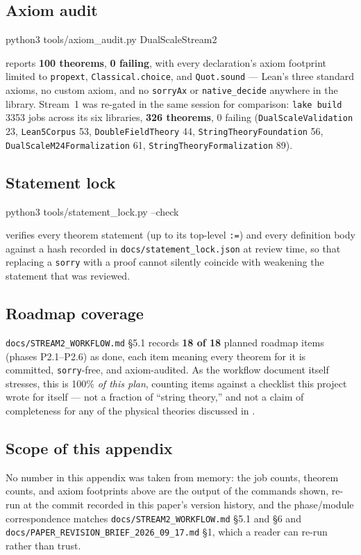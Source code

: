 \documentclass[11pt,a4paper]{article}
\theoremstyle{remark}
\begin{document}
\subsection{Axiom audit}
\begin{center}
\footnotesize\ttfamily
python3 tools/axiom\_audit.py DualScaleStream2
\end{center}
reports \textbf{100 theorems}, \textbf{0 failing}, with every declaration's axiom footprint limited
to \texttt{propext}, \texttt{Classical.choice}, and \texttt{Quot.sound} --- Lean's three standard
axioms, no custom axiom, and no \texttt{sorryAx} or \texttt{native\_decide} anywhere in the
library. Stream~1 was re-gated in the same session for comparison: \texttt{lake build} 3353 jobs
across its six libraries, \textbf{326 theorems}, 0 failing (\texttt{DualScaleValidation} 23,
\texttt{Lean5Corpus} 53, \texttt{DoubleFieldTheory} 44, \texttt{StringTheoryFoundation} 56,
\texttt{DualScaleM24Formalization} 61, \texttt{StringTheoryFormalization} 89).

\subsection{Statement lock}
\begin{center}
\footnotesize\ttfamily
python3 tools/statement\_lock.py --check
\end{center}
verifies every theorem statement (up to its top-level \texttt{:=}) and every definition body
against a hash recorded in \texttt{docs/statement\_lock.json} at review time, so that replacing a
\texttt{sorry} with a proof cannot silently coincide with weakening the statement that was
reviewed.

\subsection{Roadmap coverage}
\texttt{docs/STREAM2\_WORKFLOW.md} \S5.1 records \textbf{18 of 18} planned roadmap items
(phases P2.1--P2.6) as done, each item meaning every theorem for it is committed, \texttt{sorry}-free,
and axiom-audited. As the workflow document itself stresses, this is 100\% \emph{of this plan},
counting items against a checklist this project wrote for itself --- not a fraction of ``string
theory,'' and not a claim of completeness for any of the physical theories discussed in
.

\subsection{Scope of this appendix}
No number in this appendix was taken from memory: the job counts, theorem counts, and axiom
footprints above are the output of the commands shown, re-run at the commit recorded in this
paper's version history, and the phase/module correspondence matches
\texttt{docs/STREAM2\_WORKFLOW.md} \S5.1 and \S6 and \texttt{docs/PAPER\_REVISION\_BRIEF\_2026\_09\_17.md}
\S1, which a reader can re-run rather than trust.
\end{document}
